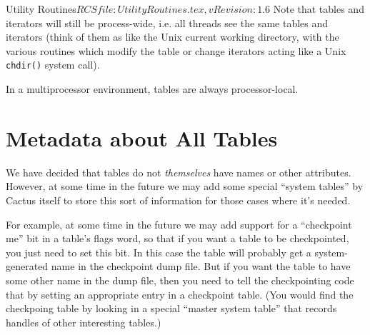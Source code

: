 \begin{cactuspart}{3}{Utility Routines}{$RCSfile: UtilityRoutines.tex,v $}{$Revision: 1.6 $}
Note that tables and iterators will still be process-wide, i.e. all
threads see the same tables and iterators (think of them as like the
Unix current working directory, with the various routines which modify
the table or change iterators acting like a Unix \verb|chdir()| system
call).

In a multiprocessor environment, tables are always processor-local.


\section{Metadata about All Tables}

We have decided that tables do not {\em themselves\/} have names or other
attributes.  However, at some time in the future we may add some special
``system tables'' by Cactus itself to store this sort of information
for those cases where it's needed.

For example, at some time in the future we may add support for a
``checkpoint me'' bit in a table's flags word, so that if you want a
table to be checkpointed, you just need to set this bit.
In this case the table will probably get a system-generated name in
the checkpoint dump file.  But if you want the table to have some
other name in the dump file, then you need to tell the checkpointing
code that by setting an appropriate entry in a checkpoint table.
(You would find the checkpoing table by looking in a special
``master system table'' that records handles of other interesting tables.)


\end{cactuspart}

